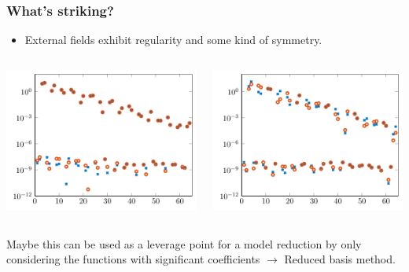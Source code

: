 \begin{frame}[t]
    \frametitle{What's striking?}

    \begin{itemize}
        \item External fields exhibit regularity and some kind of symmetry.
    \end{itemize}

    \vfill

    \begin{columns}
        \begin{column}{0.5\textwidth}
            \includegraphics[width=\textwidth]{figures/scft2.pdf}
        \end{column}
        \begin{column}{0.5\textwidth}
            \includegraphics[width=\textwidth]{figures/scft_example2_fourier_coeffs.pdf}
        \end{column}
    \end{columns}

    Maybe this can be used as a leverage point for a model reduction by only considering the functions with significant coefficients
    $\rightarrow$ Reduced basis method.
\end{frame}

